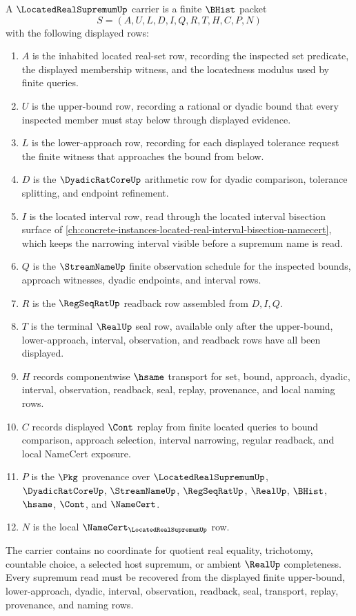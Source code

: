 \begin{definition}
\label{def:located-real-supremum-carrier}
A $\LocatedRealSupremumUp$ carrier is a finite $\BHist$ packet
$$
S=(A,U,L,D,I,Q,R,T,H,C,P,N)
$$
with the following displayed rows:
\begin{enumerate}
\item $A$ is the inhabited located real-set row, recording the inspected set predicate, the displayed membership witness, and the locatedness modulus used by finite queries.
\item $U$ is the upper-bound row, recording a rational or dyadic bound that every inspected member must stay below through displayed evidence.
\item $L$ is the lower-approach row, recording for each displayed tolerance request the finite witness that approaches the bound from below.
\item $D$ is the $\DyadicRatCoreUp$ arithmetic row for dyadic comparison, tolerance splitting, and endpoint refinement.
\item $I$ is the located interval row, read through the located interval bisection surface of \autoref{ch:concrete-instances-located-real-interval-bisection-namecert}, which keeps the narrowing interval visible before a supremum name is read.
\item $Q$ is the $\StreamNameUp$ finite observation schedule for the inspected bounds, approach witnesses, dyadic endpoints, and interval rows.
\item $R$ is the $\RegSeqRatUp$ readback row assembled from $D,I,Q$.
\item $T$ is the terminal $\RealUp$ seal row, available only after the upper-bound, lower-approach, interval, observation, and readback rows have all been displayed.
\item $H$ records componentwise $\hsame$ transport for set, bound, approach, dyadic, interval, observation, readback, seal, replay, provenance, and local naming rows.
\item $C$ records displayed $\Cont$ replay from finite located queries to bound comparison, approach selection, interval narrowing, regular readback, and local NameCert exposure.
\item $P$ is the $\Pkg$ provenance over $\LocatedRealSupremumUp$, $\DyadicRatCoreUp$, $\StreamNameUp$, $\RegSeqRatUp$, $\RealUp$, $\BHist$, $\hsame$, $\Cont$, and $\NameCert$.
\item $N$ is the local $\NameCert_{\LocatedRealSupremumUp}$ row.
\end{enumerate}
The carrier contains no coordinate for quotient real equality, trichotomy, countable choice, a selected host supremum, or ambient $\RealUp$ completeness. Every supremum read must be recovered from the displayed finite upper-bound, lower-approach, dyadic, interval, observation, readback, seal, transport, replay, provenance, and naming rows.
\end{definition}

